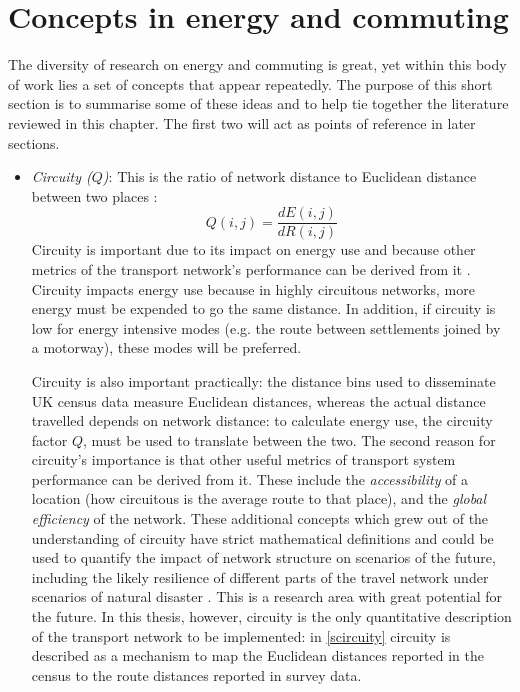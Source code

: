 \documentclass[a4paper, 11pt, twoside]{Thesis}
\begin{document}
\section{Concepts in energy and commuting} \label{skeyconcepts}
The diversity of research on energy and commuting is great, yet within this
body of work lies a set of concepts that appear repeatedly. The purpose of
this short section is to summarise some of these ideas
and to help tie together the literature reviewed in this chapter.
The first two will act as points of reference in later sections.
\begin{itemize}
 \item \emph{Circuity ($Q$)}: This is the ratio of network distance to Euclidean
distance
between two places \citep{Levinson2009}:
\begin{equation}
 Q(i,j) = \frac{dE(i,j)}{dR(i,j)}
\end{equation}
Circuity is important due to its impact on energy use \citep{Levinson2012}
and because other metrics of the transport network's performance can be
derived from it \citep{Barthelemy2011}.
Circuity impacts energy use because in highly circuitous
networks, more energy must be expended to go the same distance. In addition,
if circuity is low for energy intensive modes (e.g. the route
between settlements joined by a motorway), these modes will be preferred.

Circuity is also important practically:
the distance bins used to disseminate UK census data measure Euclidean distances,
whereas the actual distance travelled depends on network distance: to
calculate energy use, the circuity factor $Q$, must be used to translate
between the two. The second reason for circuity's importance
is that other useful metrics of transport system performance can be derived from
it. These  include the \emph{accessibility} of a location
 (how circuitous is the average route to that place), and the
\emph{global efficiency} of the network. These additional concepts
which grew out of the understanding of circuity have strict mathematical
definitions and could be used to quantify the impact of network
structure on scenarios of the future, including the likely resilience of
different parts of the travel network under scenarios of natural disaster
\citet{Barthelemy2011}. This is a research area with great potential for
the future. In this thesis, however, circuity is the only quantitative
description of the transport network to be implemented: in \ref{scircuity}
circuity is described as a mechanism to map the Euclidean
distances reported in the census to the route distances reported in survey data.


\end{itemize}
\end{document}
